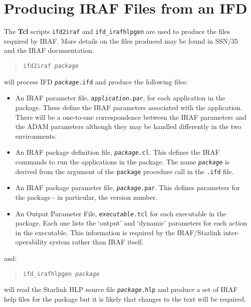 \documentclass[twoside,11pt]{article}
\newcommand{\htmlref}[2]{#1}
\newcommand{\xref}[3]{#1}
\newcommand{\xlabel}[1]{}
\begin{document}
\section{\label{ifd2iraf}\xlabel{producing_iraf_files_from_an_ifd}Producing 
IRAF Files from an IFD}
The \textbf{Tcl} scripts \texttt{ifd2iraf} and \texttt{ifd\_irafhlpgen} are 
used to produce the files required by IRAF. 
More details on the files produced may be found in
\xref{SSN/35}{ssn35}{}
and the IRAF documentation.
\begin{quote}
\texttt{ifd2iraf \textit{package}}
\end{quote}
will process IFD \texttt{\textit{package}.ifd} and produce the following files:
\begin{itemize}
\item An 
\xref{IRAF parameter file}{ssn35}{task_parameter_files},
\texttt{\textit{application}.par}, for each application in the package.
These define the IRAF parameters associated with the application. 
There will be a one-to-one correspondence between the IRAF parameters and the 
ADAM parameters although they may be handled differently in the two 
environments.
\item An 
\xref{IRAF package definition file}{ssn35}{package_definition_files},
\texttt{\textit{package}.cl}. This defines the IRAF commands to run
the applications in the package.
The name \texttt{\textit{package}} is derived from the argument of the 
\htmlref{\texttt{package}}{package} 
procedure call in the \texttt{.ifd} file.
\item An 
\xref{IRAF package parameter file}{ssn35}{package_parameter_files},
\texttt{\textit{package}.par}.
This defines parameters for the package - in particular, the version number.
\item An 
\xref{Output Parameter File}{ssn35}{the_output_parameters_file},
\texttt{\textit{executable}.tcl} for each executable in the package. 
Each one lists the 
\xref{`output'}{ssn35}{output_parameters}
and 
\xref{`dynamic'}{ssn35}{dynamic_parameters}
parameters for each action in the executable.
This information is required by the IRAF/Starlink inter-operability system 
rather than IRAF itself.
\end{itemize}
and:
\begin{quote}
\texttt{ifd\_irafhlpgen \textit{package}}
\end{quote}
will read the Starlink HLP source file \texttt{\textit{package}.hlp} and 
produce a set of
\xref{IRAF help files}{ssn35}{help_files}
for the package but it is likely that changes to the text will be required.
\end{document}
